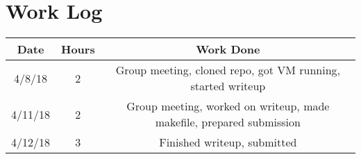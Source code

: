\documentclass[onecolumn, draftclsnofoot,10pt, compsoc]{IEEEtran}
\begin{document}
\section{Work Log}
\begin{center}
 \begin{tabular}{||c c c ||} 
 \hline
 Date & Hours & Work Done\\ [0.5ex] 
 \hline\hline
 4/8/18 & 2 & Group meeting, cloned repo, got VM running, started writeup\\ 
 \hline
  4/11/18 & 2 & Group meeting, worked on writeup, made makefile, prepared submission\\ 
 \hline
 4/12/18 & 3 & Finished writeup, submitted\\
 [1ex] 
 \hline
\end{tabular}
\end{center}


\end{document}
